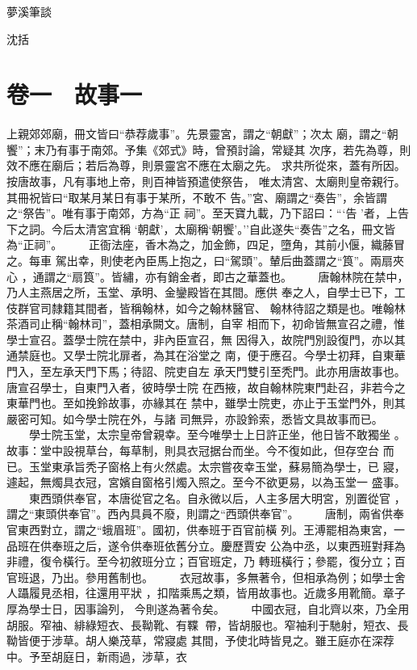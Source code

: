 \documentclass{ctexart}
\begin{document}
\vspace*{\fill}
\Huge
\begin{center}
夢溪筆談
\end{center}
\bigskip
\begin{center}
沈括
\end{center}
\vspace*{\fill}
\clearpage
\normalsize
\tableofcontents
\clearpage
{}
\section{卷一　故事一}
\paragraph{}
上親郊郊廟，冊文皆曰``恭荐歲事''。先景靈宮，謂之``朝獻''；次太 廟，謂之``朝饗''；末乃有事于南郊。予集《郊式》時，曾預討論，常疑其 次序，若先為尊，則效不應在廟后；若后為尊，則景靈宮不應在太廟之先。 求共所從來，蓋有所因。按唐故事，凡有事地上帝，則百神皆預遣使祭告， 唯太清宮、太廟則皇帝親行。其冊祝皆曰``取某月某日有事于某所，不敢不 告。''宮、廟謂之``奏告''，余皆謂之``祭告''。唯有事于南郊，方為``正 祠''。至天寶九載，乃下詔曰：```告 '者，上告下之詞。今后太清宮宜稱 `朝獻'，太廟稱`朝饗'。''自此遂失``奏告''之名，冊文皆為``正祠''。 　　正衙法座，香木為之，加金飾，四足，墮角，其前小偃，織藤冒之。每車 駕出幸，則使老內臣馬上抱之，曰``駕頭''。輦后曲蓋謂之``筤''。兩扇夾心 ，通謂之``扇筤''。皆繡，亦有銷金者，即古之華蓋也。 　　唐翰林院在禁中，乃人主燕居之所，玉堂、承明、金鑾殿皆在其間。應供 奉之人，自學士已下，工伎群官司隸籍其間者，皆稱翰林，如今之翰林醫官、 翰林待詔之類是也。唯翰林茶酒司止稱``翰林司''，蓋相承闕文。唐制，自宰 相而下，初命皆無宣召之禮，惟學士宣召。蓋學士院在禁中，非內臣宣召，無 因得入，故院門別設復門，亦以其通禁庭也。又學士院北扉者，為其在浴堂之 南，便于應召。今學士初拜，自東華門入，至左承天門下馬；待詔、院吏自左 承天門雙引至秃門。此亦用唐故事也。唐宣召學士，自東門入者，彼時學士院 在西掖，故自翰林院東門赴召，非若今之東華門也。至如挽鈴故事，亦緣其在 禁中，雖學士院吏，亦止于玉堂門外，則其嚴密可知。如今學士院在外，与諸 司無异，亦設鈴索，悉皆文具故事而已。 　　學士院玉堂，太宗皇帝曾親幸。至今唯學士上日許正坐，他日皆不敢獨坐 。故事：堂中設視草台，每草制，則具衣冠据台而坐。今不復如此，但存空台 而已。玉堂東承旨秃子窗格上有火然處。太宗嘗夜幸玉堂，蘇易簡為學士，已 寢，遽起，無燭具衣冠，宮嬪自窗格引燭入照之。至今不欲更易，以為玉堂一 盛事。 　　東西頭供奉官，本唐從官之名。自永微以后，人主多居大明宮，別置從官 ，謂之``東頭供奉官''。西內具員不廢，則謂之``西頭供奉官''。 　　唐制，兩省供奉官東西對立，謂之``蛾眉班''。國初，供奉班于百官前橫 列。王溥罷相為東宮，一品班在供奉班之后，遂令供奉班依舊分立。慶歷賈安 公為中丞，以東西班對拜為非禮，復令橫行。至今初敘班分立；百官班定，乃 轉班橫行；參罷，復分立；百官班退，乃出。參用舊制也。 　　衣冠故事，多無著令，但相承為例；如學士舍人躡履見丞相，往還用平狀 ，扣階乘馬之類，皆用故事也。近歲多用靴簡。章子厚為學士日，因事論列， 今則遂為著令矣。 　　中國衣冠，自北齊以來，乃全用胡服。窄袖、緋綠短衣、長靿靴、有鞢 帶，皆胡服也。窄袖利于馳射，短衣、長靿皆便于涉草。胡人樂茂草，常寢處 其間，予使北時皆見之。雖王庭亦在深荐中。予至胡庭日，新雨過，涉草，衣 
\end{document}
